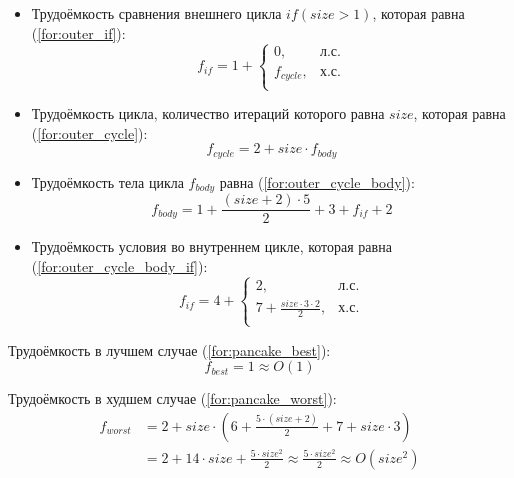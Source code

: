 \begin{itemize}
	\item Трудоёмкость сравнения внешнего цикла $if  (size > 1)$, которая равна (\ref{for:outer_if}):
	\begin{equation}
		\label{for:outer_if}
		f_{if} =1 + \begin{cases}
			0, & \text{л.с.}\\
			f_{cycle}, & \text{х.с.}\\
		\end{cases}
	\end{equation}
	\item Трудоёмкость цикла, количество итераций которого равна  $size$, которая равна (\ref{for:outer_cycle}):
	\begin{equation}
		\label{for:outer_cycle}
		f_{cycle} = 2 + size \cdot f_{body}
	\end{equation}
	\item Трудоёмкость тела цикла $f_{body}$ равна (\ref{for:outer_cycle_body}):
	\begin{equation}
		\label{for:outer_cycle_body}
		f_{body} = 1 + \frac{(size + 2) \cdot 5}{2} + 3 + f_{if} + 2
	\end{equation}
	\item Трудоёмкость условия во внутреннем цикле, которая равна (\ref{for:outer_cycle_body_if}):
	\begin{equation}
		\label{for:outer_cycle_body_if}
		f_{if} = 4 + \begin{cases}
			2, & \text{л.с.}\\
			7 + \frac{size \cdot 3 \cdot 2}{2} , & \text{х.с.}\\
		\end{cases}
	\end{equation}
\end{itemize}

Трудоёмкость в лучшем случае (\ref{for:pancake_best}):
\begin{equation}
	\label{for:pancake_best}
	f_{best} = 1 \approx  O(1)
\end{equation}

Трудоёмкость в худшем случае (\ref{for:pancake_worst}):
\begin{align}
	\label{for:pancake_worst}
	f_{worst} &= 2 + size \cdot (6 + \frac{5 \cdot (size + 2)}{2} + 7 + size \cdot 3)  \\
	&= 2 + 14 \cdot size + \frac{5\cdot size^2}{2} \approx \frac{5\cdot size^2}{2} \approx O(size^2)
\end{align}


